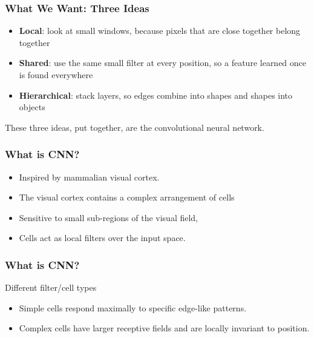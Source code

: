 \begin{frame}[fragile] \frametitle{What We Want: Three Ideas}
\begin{itemize}
\item \textbf{Local}: look at small windows, because pixels that are close together belong together
\item \textbf{Shared}: use the same small filter at every position, so a feature learned once is found everywhere
\item \textbf{Hierarchical}: stack layers, so edges combine into shapes and shapes into objects
\end{itemize}
\begin{center}
\small
{}
\end{center}
These three ideas, put together, are the convolutional neural network.
\end{frame}

\begin{frame}[fragile] \frametitle{What is CNN?}

\begin{itemize}
\item Inspired by mammalian visual cortex.
\item The visual cortex contains a complex arrangement of cells
\item Sensitive to small sub-regions of the visual field, 
\item Cells act as local filters over the input space.
\end{itemize}
\end{frame}

\begin{frame}[fragile] \frametitle{What is CNN?}

Different filter/cell types
\begin{itemize}
\item Simple cells respond maximally to specific edge-like patterns.
\item Complex cells have larger receptive fields and are locally invariant to position.

\end{itemize}
\end{frame}

